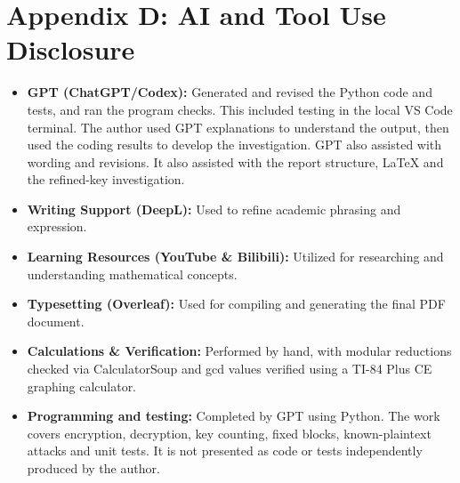 \documentclass[11pt,a4paper]{article}
\theoremstyle{plain}
\theoremstyle{definition}
\begin{document}
\clearpage
\section*{Appendix D: AI and Tool Use Disclosure}

\begin{itemize}
    \item \textbf{GPT (ChatGPT/Codex):} Generated and revised the Python code and tests, and ran the program checks. This included testing in the local VS Code terminal. The author used GPT explanations to understand the output, then used the coding results to develop the investigation. GPT also assisted with wording and revisions. It also assisted with the report structure, LaTeX and the refined-key investigation.
    \item \textbf{Writing Support (DeepL):} Used to refine academic phrasing and expression.
    \item \textbf{Learning Resources (YouTube \& Bilibili):} Utilized for researching and understanding mathematical concepts.
    \item \textbf{Typesetting (Overleaf):} Used for compiling and generating the final PDF document.
    \item \textbf{Calculations \& Verification:} Performed by hand, with modular reductions checked via CalculatorSoup and gcd values verified using a TI-84 Plus CE graphing calculator.
    \item \textbf{Programming and testing:} Completed by GPT using Python. The work covers encryption, decryption, key counting, fixed blocks, known-plaintext attacks and unit tests. It is not presented as code or tests independently produced by the author.
\end{itemize}
\end{document}
